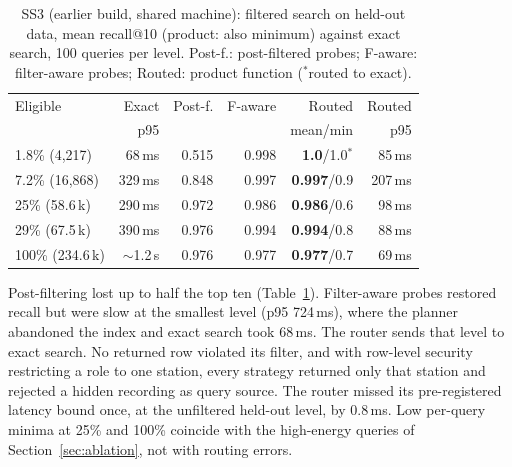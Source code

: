 \documentclass[sigconf]{acmart}
\begin{document}
\begin{table}[t]
\caption{SS3 (earlier build, shared machine): filtered search on held-out data, mean recall@10 (product: also minimum) against exact search, 100 queries per level. Post-f.: post-filtered probes; F-aware: filter-aware probes; Routed: product function ($^*$routed to exact).}
\label{tab:ss3}
\small\setlength{\tabcolsep}{3pt}
\begin{tabular}{@{}lrrrrr@{}}
\toprule
Eligible & Exact & Post-f. & F-aware & Routed & Routed \\
 & p95 & & & mean/min & p95 \\
\midrule
1.8\% (4,217) & 68\,ms & 0.515 & 0.998 & \textbf{1.0}/1.0$^*$ & 85\,ms \\
7.2\% (16,868) & 329\,ms & 0.848 & 0.997 & \textbf{0.997}/0.9 & 207\,ms \\
25\% (58.6\,k) & 290\,ms & 0.972 & 0.986 & \textbf{0.986}/0.6 & 98\,ms \\
29\% (67.5\,k) & 390\,ms & 0.976 & 0.994 & \textbf{0.994}/0.8 & 88\,ms \\
100\% (234.6\,k) & $\sim$1.2\,s & 0.976 & 0.977 & \textbf{0.977}/0.7 & 69\,ms \\
\bottomrule
\end{tabular}
\end{table}

Post-filtering lost up to half the top ten (Table~\ref{tab:ss3}). Filter-aware probes restored recall but were slow at the smallest level (p95 724\,ms), where the planner abandoned the index and exact search took 68\,ms. The router sends that level to exact search. No returned row violated its filter, and with row-level security restricting a role to one station, every strategy returned only that station and rejected a hidden recording as query source. The router missed its pre-registered latency bound once, at the unfiltered held-out level, by 0.8\,ms. Low per-query minima at 25\% and 100\% coincide with the high-energy queries of Section~\ref{sec:ablation}, not with routing errors.
\end{document}
